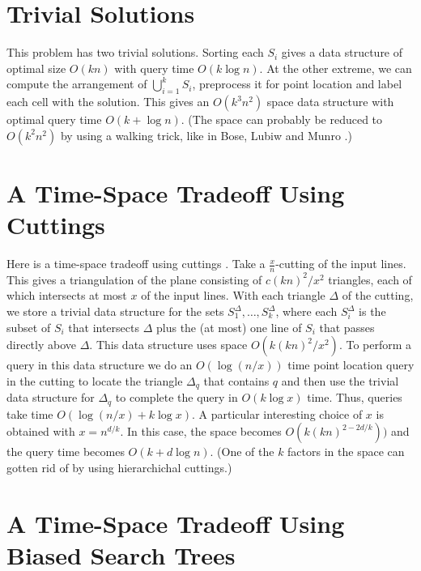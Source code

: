 \documentclass{article}
\begin{document}
\section{Trivial Solutions}

This problem has two trivial solutions.  Sorting each $S_i$ gives a
data structure of optimal size $O(kn)$ with query time $O(k\log n)$.
At the other extreme, we can compute the arrangement of
$\bigcup_{i=1}^k S_i$, preprocess it for point location and label each
cell with the solution.  This gives an $O(k^3n^2)$ space data
structure with optimal query time $O(k + \log n)$.  (The space can
probably be reduced to $O(k^2n^2)$ by using a walking trick, like in
Bose, Lubiw and Munro \cite{blm02}.)

\section{A Time-Space Tradeoff Using Cuttings}

Here is a time-space tradeoff using cuttings \cite{m98}. Take a
$\frac{x}{n}$-cutting of the input lines.  This gives a triangulation
of the plane consisting of $c(kn)^2/x^2$ triangles, each of which
intersects at most $x$ of the input lines.  With each triangle
$\Delta$ of the cutting, we store a trivial data structure for the
sets $S_1^\Delta,\ldots,S_k^\Delta$, where each $S_i^\Delta$ is the
subset of $S_i$ that intersects $\Delta$ plus the (at most) one line
of $S_i$ that passes directly above $\Delta$.  This data structure
uses space $O(k(kn)^2/x^2)$.  To perform a query in this data
structure we do an $O(\log (n/x))$ time point location query in the
cutting to locate the triangle $\Delta_q$ that contains $q$ and then
use the trivial data structure for $\Delta_q$ to complete the query in
$O(k\log x)$ time.  Thus, queries take time $O(\log(n/x) + k\log x)$.
A particular interesting choice of $x$ is obtained with $x=n^{d/k}$.
In this case, the space becomes $O(k(kn)^{2-2d/k}))$ and the query
time becomes $O(k + d\log n)$.  (One of the $k$ factors in the space
can gotten rid of by using hierarchichal cuttings.)

\section{A Time-Space Tradeoff Using Biased Search Trees}
\end{document}
